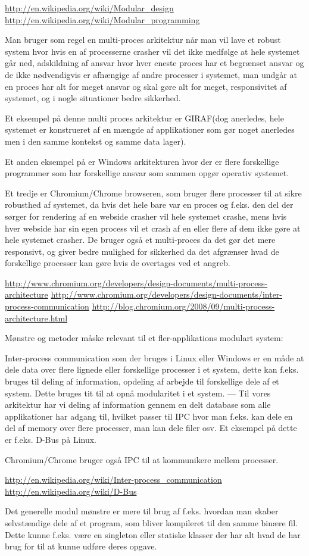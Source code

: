 \url{http://en.wikipedia.org/wiki/Modular_design}
\url{http://en.wikipedia.org/wiki/Modular_programming}

Man bruger som regel en multi-proces arkitektur når man vil lave et robust system hvor hvis en af processerne crasher vil det ikke medfølge at hele systemet går ned, adskildning af ansvar hvor hver eneste proces har et begrænset ansvar og de ikke nødvendigvis er afhængige af andre processer i systemet, man undgår at en proces har alt for meget ansvar og skal gøre alt for meget, responsivitet af systemet, og i nogle situationer bedre sikkerhed.

Et eksempel på denne multi proces arkitektur er GIRAF(dog anerledes, hele systemet er konstrueret af en mængde af applikationer som gør noget anerledes men i den samme kontekst og samme data lager). 

Et anden eksempel på er Windows arkitekturen hvor der er flere forskellige programmer som har forskellige ansvar som sammen opgør operativ systemet. 

Et tredje er Chromium/Chrome browseren, som bruger flere processer til at sikre robusthed af systemet, da hvis det hele bare var en proces og f.eks. den del der sørger for rendering af en webside crasher vil hele systemet crashe, mens hvis hver webside har sin egen process vil et crash af en eller flere af dem ikke gøre at hele systemet crasher. De bruger også et multi-proces da det gør det mere responsivt, og giver bedre mulighed for sikkerhed da det afgrænser hvad de forskellige processer kan gøre hvis de overtages ved et angreb.

\url{http://www.chromium.org/developers/design-documents/multi-process-architecture}
\url{http://www.chromium.org/developers/design-documents/inter-process-communication}
\url{http://blog.chromium.org/2008/09/multi-process-architecture.html}

Mønstre og metoder måske relevant til et fler-applikations modulart system:

Inter-process communication som der bruges i Linux eller Windows er en måde at dele data over flere lignede eller forskellige processer i et system, dette kan f.eks. bruges til deling af information, opdeling af arbejde til forskellige dele af et system. Dette bruges tit til at opnå modularitet i et system. --- Til vores arkitektur har vi deling af information gennem en delt database som alle applikationer har adgang til, hvilket passer til IPC hvor man f.eks. kan dele en del af memory over flere processer, man kan dele filer osv. Et eksempel på dette er f.eks. D-Bus på Linux.

Chromium/Chrome bruger også IPC til at kommunikere mellem processer.

\url{http://en.wikipedia.org/wiki/Inter-process_communication}
\url{http://en.wikipedia.org/wiki/D-Bus}

Det generelle modul mønstre er mere til brug af f.eks. hvordan man skaber selvstændige dele af et program, som bliver kompileret til den samme binære fil. Dette kunne f.eks. være en singleton eller statiske klasser der har alt hvad de har brug for til at kunne udføre deres opgave. 
